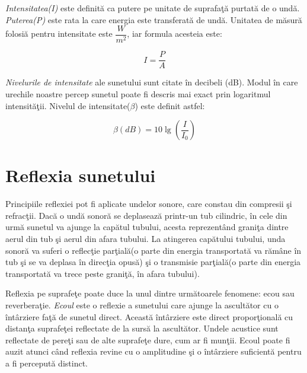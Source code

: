 	{\it{Intensitatea(I)}} este definit\u{a} ca putere pe unitate de suprafa\c{t}\u{a} purtat\u{a} de o und\u{a}. {\it{Puterea(P)}} este rata la care energia este transferat\u{a} de und\u{a}. Unitatea de m\u{a}sur\u{a} folosi\u{a} pentru intensitate este $\dfrac{W}{m^2}$, iar formula acesteia este:
	
	\begin{equation}
	I=\frac{P}{A}
	\end{equation}
	\bigskip
	
	{\it{Nivelurile de intensitate}} ale sunetului sunt citate în decibeli (dB). Modul în care urechile noastre percep sunetul poate fi descris mai exact prin logaritmul intensit\u{a}\c{t}ii. Nivelul de intensitate($\beta$) este definit astfel:
	
	\begin{equation}
	\beta(dB) = 10 \lg\left(\dfrac{I}{I_0}\right) 
	\end{equation}
	
	\section{Reflexia sunetului}
	
	Principiile reflexiei pot fi aplicate undelor sonore, care constau din compresii \c{s}i refrac\c{t}ii. Dac\u{a} o und\u{a} sonor\u{a} se deplaseaz\u{a} printr-un tub cilindric, \^{i}n cele din urm\u{a} sunetul va ajunge la cap\u{a}tul tubului, acesta reprezent\^{a}nd grani\c{t}a dintre aerul din tub \c{s}i aerul din afara tubului. La atingerea cap\u{a}tului tubului, unda sonor\u{a} va suferi o reflec\c{t}ie par\c{t}ial\u{a}(o parte din energia transportat\u{a} va r\u{a}m\^{a}ne \^{i}n tub \c{s}i se va deplasa \^{i}n direc\c{t}ia opus\u{a}) \c{s}i o transmisie par\c{t}ial\u{a}(o parte din energia transportat\u{a} va trece peste grani\c{t}\u{a}, \^{i}n afara tubului).
	\bigskip
	
	Reflexia pe suprafe\c{t}e poate duce la unul dintre urm\u{a}toarele fenomene: ecou sau reverbera\c{t}ie. {\it{Ecoul}} este o reflexie a sunetului care ajunge la ascult\u{a}tor cu o \^{i}nt\^{a}rziere fa\c{t}\u{a} de sunetul direct. Aceast\u{a} \^{i}nt\^{a}rziere este direct propor\c{t}ional\u{a} cu distan\c{t}a suprafe\c{t}ei reflectate de la surs\u{a} la ascult\u{a}tor. Undele acustice sunt reflectate de pere\c{t}i sau de alte suprafe\c{t}e dure, cum ar fi mun\c{t}ii. Ecoul poate fi auzit atunci c\^{a}nd reflexia revine cu o amplitudine \c{s}i o \^{i}nt\^{a}rziere suficient\u{a} pentru a fi perceput\u{a} distinct. 
	\bigskip
	
